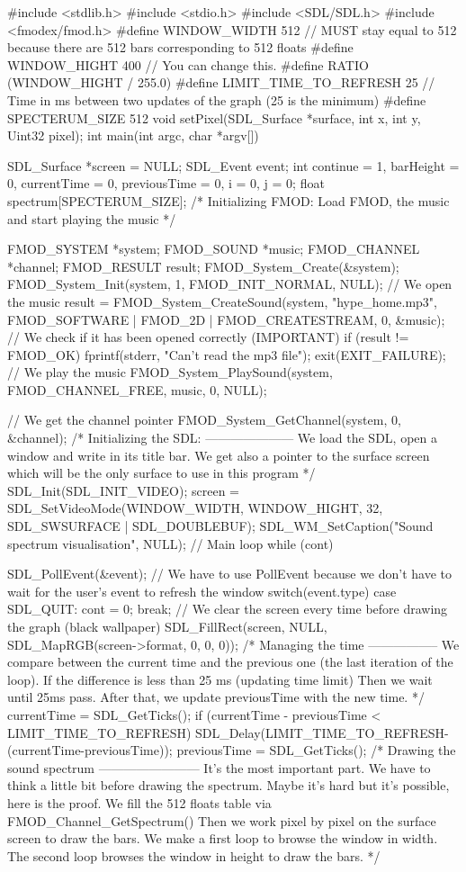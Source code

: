 \begin{Csource}
#include <stdlib.h>
#include <stdio.h>
#include <SDL/SDL.h>
#include <fmodex/fmod.h>
#define WINDOW_WIDTH 512 // MUST stay equal to 512 because there are 512 bars corresponding to 512 floats
#define WINDOW_HIGHT 400 // You can change this.
#define RATIO (WINDOW_HIGHT / 255.0)
#define LIMIT_TIME_TO_REFRESH 25 // Time in ms between two updates of the graph (25 is the minimum)
#define SPECTERUM_SIZE 512
void setPixel(SDL_Surface *surface, int x, int y, Uint32 pixel);
int main(int argc, char *argv[])
{
	SDL_Surface *screen = NULL;
	SDL_Event event;
	int continue = 1, barHeight = 0, currentTime = 0, previousTime = 0, i = 0, j = 0;
	float spectrum[SPECTERUM_SIZE];
	/* Initializing FMOD:
	Load FMOD, the music and start playing the music
	*/
	
	FMOD_SYSTEM *system;
	FMOD_SOUND *music;
	FMOD_CHANNEL *channel;
	FMOD_RESULT result;
	FMOD_System_Create(&system);
	FMOD_System_Init(system, 1, FMOD_INIT_NORMAL, NULL);
	// We open the music
	result = FMOD_System_CreateSound(system, "hype_home.mp3", FMOD_SOFTWARE | FMOD_2D | FMOD_CREATESTREAM, 0, &music);
	// We check if it has been opened correctly (IMPORTANT)
	if (result != FMOD_OK)
	{
		fprintf(stderr, "Can't read the mp3 file\n");
		exit(EXIT_FAILURE);
	}
	// We play the music
	FMOD_System_PlaySound(system, FMOD_CHANNEL_FREE, music, 0, NULL);
	
	// We get the channel pointer
	FMOD_System_GetChannel(system, 0, &channel);
	/*
	Initializing the SDL:
	---------------------
	We load the SDL, open a window and write in its title bar.
	We get also a pointer to the surface screen which will be the only surface to use in this program 
	*/
	SDL_Init(SDL_INIT_VIDEO);
	screen = SDL_SetVideoMode(WINDOW_WIDTH, WINDOW_HIGHT, 32, SDL_SWSURFACE | SDL_DOUBLEBUF);
	SDL_WM_SetCaption("Sound spectrum visualisation", NULL);
	// Main loop	
	while (cont)
	{
		SDL_PollEvent(&event); // We have to use PollEvent because we don't have to wait for the user's event to refresh the window
		switch(event.type)
		{
			case SDL_QUIT:
			cont = 0;
			break;
		}
		// We clear the screen every time before drawing the graph (black wallpaper)
		SDL_FillRect(screen, NULL, SDL_MapRGB(screen->format, 0, 0, 0));
		/* Managing the time
		-----------------
		We compare between the current time and the previous one (the last iteration of the loop).
		If the difference is less than 25 ms (updating time limit)
		Then we wait until 25ms pass.
		After that, we update previousTime with the new time. */
		currentTime = SDL_GetTicks();
		if (currentTime - previousTime < LIMIT_TIME_TO_REFRESH)
		{
			SDL_Delay(LIMIT_TIME_TO_REFRESH-(currentTime-previousTime));
		}
		previousTime = SDL_GetTicks();
		/* Drawing the sound spectrum
		------------------------
		It's the most important part. We have to think a little bit before drawing the spectrum. Maybe it's hard but it's possible, here is the proof.
		We fill the 512 floats table via FMOD_Channel_GetSpectrum()
		Then we work pixel by pixel on the surface screen to draw the bars.
		We make a first loop to browse the window in width.
		The second loop browses the window in height to draw the bars.
		*/
		
}}
\end{Csource}
